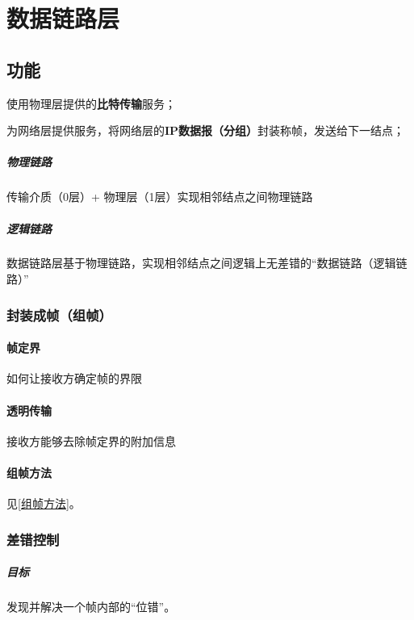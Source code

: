 
\chapter{数据链路层}

\section{功能}

使用物理层提供的\textbf{比特传输}服务；

为网络层提供服务，将网络层的\textbf{IP数据报（分组）}封装称帧，发送给下一结点；


\paragraph{物理链路}
传输介质（0层）+ 物理层（1层）实现相邻结点之间物理链路

\paragraph{逻辑链路}
数据链路层基于物理链路，实现相邻结点之间逻辑上无差错的“数据链路（逻辑链路）”


\subsection{封装成帧（组帧）}

\subsubsection{帧定界}
如何让接收方确定帧的界限


\subsubsection{透明传输}
接收方能够去除帧定界的附加信息


\subsubsection{组帧方法}
见\ref{组帧方法}。


\subsection{差错控制}

\paragraph{目标}
发现并解决一个帧内部的“位错”。


